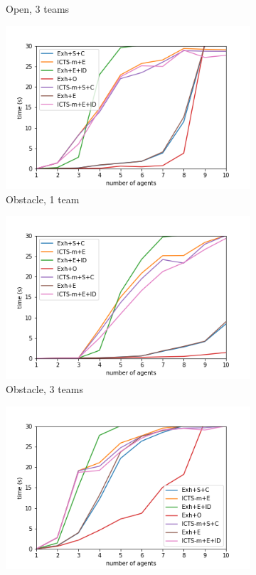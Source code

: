 \documentclass[english]{article}
\begin{document}
\begin{figure}
\begin{subfigure}{0.49\textwidth}
		\caption{Open, 3 teams}
		\label{fig:open3}
		\end{subfigure}
		\begin{subfigure}{0.49\textwidth}
			\centering
			\includegraphics[width=\linewidth]{img/results/obstacle-1}
			\caption{Obstacle, 1 team}
			\label{fig:obstacle1}
		\end{subfigure}
		\begin{subfigure}{0.49\textwidth}
		\centering
		\includegraphics[width=\linewidth]{img/results/obstacle-3}
		\caption{Obstacle, 3 teams}
		\label{fig:obstacle3}
		\end{subfigure}
		\begin{subfigure}{0.49\textwidth}
			\centering
			\includegraphics[width=\linewidth]{img/results/maze-1}

\end{subfigure}
\end{figure}
\end{document}
